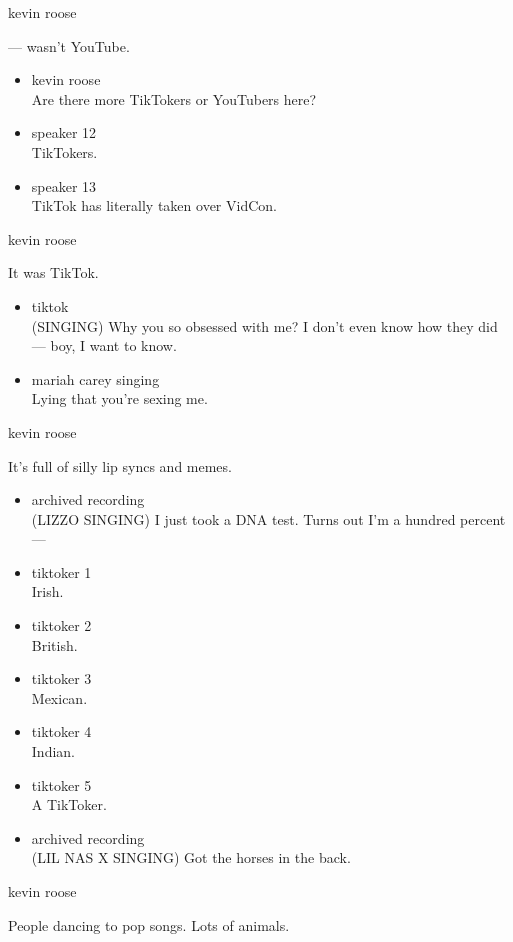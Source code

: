 kevin roose

--- wasn't YouTube.

\begin{itemize}
\item
  kevin roose\\
  Are there more TikTokers or YouTubers here?
\item
  speaker 12\\
  TikTokers.
\item
  speaker 13\\
  TikTok has literally taken over VidCon.
\end{itemize}

kevin roose

It was TikTok.

\begin{itemize}
\item
  tiktok\\
  (SINGING) Why you so obsessed with me? I don't even know how they did
  --- boy, I want to know.
\item
  mariah carey singing\\
  Lying that you're sexing me.
\end{itemize}

kevin roose

It's full of silly lip syncs and memes.

\begin{itemize}
\item
  archived recording\\
  (LIZZO SINGING) I just took a DNA test. Turns out I'm a hundred
  percent ---
\item
  tiktoker 1\\
  Irish.
\item
  tiktoker 2\\
  British.
\item
  tiktoker 3\\
  Mexican.
\item
  tiktoker 4\\
  Indian.
\item
  tiktoker 5\\
  A TikToker.
\item
  archived recording\\
  (LIL NAS X SINGING) Got the horses in the back.
\end{itemize}

kevin roose

People dancing to pop songs. Lots of animals.

